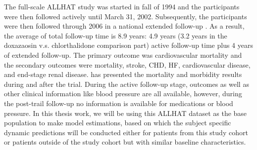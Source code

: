 The full-scale ALLHAT study was started in fall of 1994 and the participants were then followed actively until March 31, 2002. Subsequently, the participants were then followed through 2006 in a national extended follow-up \citep{piller2011long}. As a result, the average of total follow-up time is 8.9 years: 4.9 years (3.2 years in the doxazaosin v.s. chlorthalidone comparison part) active follow-up time plus 4 years of extended follow-up. The primary outcome was cardiovascular mortality and the secondary outcomes were mortality, stroke, CHD, HF, cardiovascular disease, and end-stage renal disease. \cite{cushman2012mortality} has presented the mortality and morbidity results during and after the trial. During the active follow-up stage, outcomes as well as other clinical information like blood pressure are all available, however, during the post-trail follow-up no information is available for medications or blood pressure. In this thesis work, we will be using this ALLHAT dataset as the base population to make model estimations, based on which the subject specific dynamic predictions will be conducted either for patients from this study cohort or patients outside of the study cohort but with similar baseline characteristics.

% 



























% 